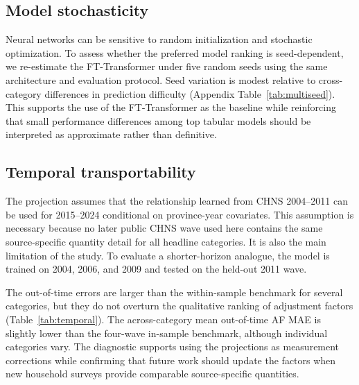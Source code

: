 \documentclass[preprint,12pt,authoryear]{elsarticle}
\begin{document}
\subsection{Model stochasticity}
\label{subsec:seeds}

Neural networks can be sensitive to random initialization and stochastic optimization. To assess whether the preferred model ranking is seed-dependent, we re-estimate the FT-Transformer under five random seeds using the same architecture and evaluation protocol. Seed variation is modest relative to cross-category differences in prediction difficulty (Appendix Table~\ref{tab:multiseed}). This supports the use of the FT-Transformer as the baseline while reinforcing that small performance differences among top tabular models should be interpreted as approximate rather than definitive.

\subsection{Temporal transportability}
\label{subsec:temporal}

The projection assumes that the relationship learned from CHNS 2004--2011 can be used for 2015--2024 conditional on province-year covariates. This assumption is necessary because no later public CHNS wave used here contains the same source-specific quantity detail for all headline categories. It is also the main limitation of the study. To evaluate a shorter-horizon analogue, the model is trained on 2004, 2006, and 2009 and tested on the held-out 2011 wave.

The out-of-time errors are larger than the within-sample benchmark for several categories, but they do not overturn the qualitative ranking of adjustment factors (Table~\ref{tab:temporal}). The across-category mean out-of-time AF MAE is slightly lower than the four-wave in-sample benchmark, although individual categories vary. The diagnostic supports using the projections as measurement corrections while confirming that future work should update the factors when new household surveys provide comparable source-specific quantities.
\end{document}
